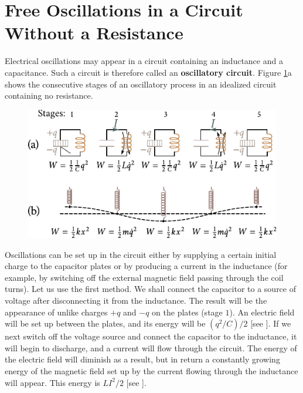 \section{Free Oscillations in a Circuit Without a Resistance}\label{sec:13_2}

Electrical oscillations may appear in a circuit containing an inductance and a capacitance.
Such a circuit is therefore called an \textbf{oscillatory circuit}.
Figure \ref{fig:13_1}a shows the consecutive stages of an oscillatory process in an idealized circuit containing no resistance.

\begin{figure}[t]
	\begin{center}
		\includegraphics[scale=1.1]{figures/ch_13/fig_13_1.pdf}
		\caption[]{}
		\label{fig:13_1}
	\end{center}
	\vspace{-0.8cm}
\end{figure}

Oscillations can be set up in the circuit either by supplying a certain initial charge to the capacitor plates or by producing a current in the inductance (for example, by switching off the external magnetic field passing through the coil turns).
Let us use the first method.
We shall connect the capacitor to a source of voltage after disconnecting it from the inductance.
The result will be the appearance of unlike charges $+q$ and $-q$ on the plates (stage $1$).
An electric field will be set up between the plates, and its energy will be $(q^2/C)/2$ [see ].
If we next switch off the voltage source and connect the capacitor to the inductance, it will begin to discharge, and a current will flow through the circuit.
The energy of the electric field will diminish as a result, but in return a constantly growing energy of the magnetic field set up by the current flowing through the inductance will appear.
This energy is $LI^2/2$ [see ].

